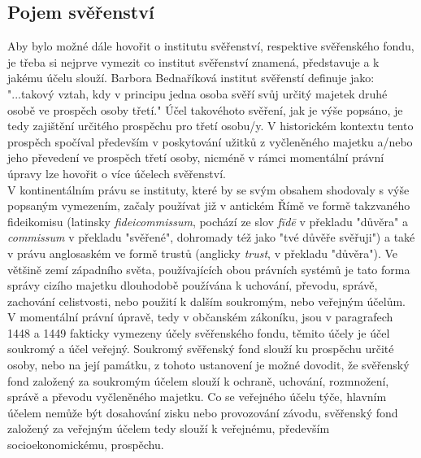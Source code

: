 \documentclass{article}
\begin{document}
\newpage

\subsection{Pojem svěřenství}

\indent Aby bylo možné dále hovořit o institutu svěřenství, respektive svěřenského fondu, je třeba si nejprve vymezit co institut svěřenství znamená, představuje a k jakému účelu slouží. Barbora Bednaříková institut svěřenstí definuje jako: "...takový vztah, kdy v principu jedna osoba svěří svůj určitý majetek druhé osobě ve prospěch osoby třetí." Účel takovéhoto svěření, jak je výše popsáno, je tedy zajištění určitého prospěchu pro třetí osobu/y. V historickém kontextu tento prospěch spočíval především v poskytování užitků z vyčleněného majetku a/nebo jeho převedení ve prospěch třetí osoby, nicméně v rámci momentální právní úpravy lze hovořit o více účelech svěřenství. \\

\indent V kontinentálním právu se instituty, které by se svým obsahem shodovaly s výše popsaným vymezením, začaly používat již v antickém Římě ve formě takzvaného fideikomisu (latinsky \textit{fideicommissum}, pochází ze slov \textit{fīdē} v překladu "důvěra" a \textit{commissum} v překladu "svěřené", dohromady též jako "tvé důvěře svěřuji") a také v právu anglosaském ve formě trustů (anglicky \textit{trust}, v překladu "důvěra"). Ve většině zemí západního světa, používajících obou právních systémů je tato forma správy cizího majetku dlouhodobě používána k uchování, převodu, správě, zachování celistvosti, nebo použití k dalším soukromým, nebo veřejným účelům.\\

\indent V momentální právní úpravě, tedy v občanském zákoníku, jsou v paragrafech 1448 a 1449 fakticky vymezeny účely svěřenského fondu, těmito účely je účel soukromý a účel veřejný. Soukromý svěřenský fond slouží ku prospěchu určité osoby, nebo na její památku, z tohoto ustanovení je možné dovodit, že svěřenský fond založený za soukromým účelem slouží k ochraně, uchování, rozmnožení, správě a převodu vyčleněného majetku. Co se veřejného účelu týče, hlavním účelem nemůže být dosahování zisku nebo provozování závodu, svěřenský fond založený za veřejným účelem tedy slouží k veřejnému, především socioekonomickému, prospěchu.\\
\end{document}
